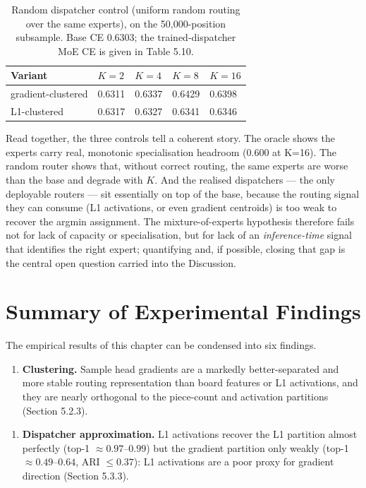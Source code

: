 \begin{table}[H]
\centering
\caption{Random dispatcher control (uniform random routing over the same experts), on the 50,000-position subsample. Base CE 0.6303; the trained-dispatcher MoE CE is given in Table 5.10.}
\small
\begin{tabular}{lllll}
\toprule
Variant & $K{=}2$ & $K{=}4$ & $K{=}8$ & $K{=}16$ \\
\midrule
gradient-clustered & 0.6311 & 0.6337 & 0.6429 & 0.6398 \\
L1-clustered & 0.6317 & 0.6327 & 0.6341 & 0.6346 \\
\bottomrule
\end{tabular}
\end{table}


Read together, the three controls tell a coherent story. The oracle shows the experts carry real, monotonic specialisation headroom (0.600 at K=16). The random router shows that, without correct routing, the same experts are worse than the base and degrade with $K$. And the realised dispatchers --- the only deployable routers --- sit essentially on top of the base, because the routing signal they can consume (L1 activations, or even gradient centroids) is too weak to recover the argmin assignment. The mixture-of-experts hypothesis therefore fails not for lack of capacity or specialisation, but for lack of an \emph{inference-time} signal that identifies the right expert; quantifying and, if possible, closing that gap is the central open question carried into the Discussion.


\section{Summary of Experimental Findings}

The empirical results of this chapter can be condensed into six findings.

\begin{enumerate}
  \item \textbf{Clustering.} Sample head gradients are a markedly better-separated and more stable routing representation than board features or L1 activations, and they are nearly orthogonal to the piece-count and activation partitions (Section 5.2.3).
\end{enumerate}


\begin{enumerate}
  \item \textbf{Dispatcher approximation.} L1 activations recover the L1 partition almost perfectly (top-1 $\approx 0.97\text{--}0.99$) but the gradient partition only weakly (top-1 $\approx 0.49\text{--}0.64$, ARI $\leq 0.37$): L1 activations are a poor proxy for gradient direction (Section 5.3.3).
\end{enumerate}


